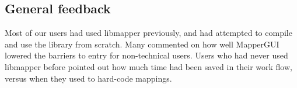 

%


	\subsection{General feedback} %
	\label{sub:general_feedback}

Most of our users had used libmapper previously, and had attempted to compile and use the library from scratch. Many commented on how well MapperGUI lowered the barriers to entry for non-technical users. Users who had never used libmapper before pointed out how much time had been saved in their work flow, versus when they used to hard-code mappings.

